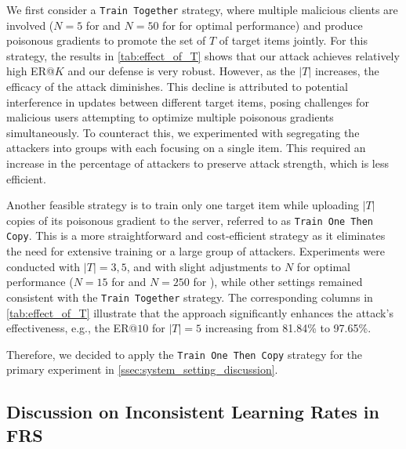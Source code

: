 We first consider a \texttt{Train Together} strategy, where multiple malicious clients are involved ($N=5$ for \modelI{} and $N=50$ for \modelII{} for optimal performance) and produce poisonous gradients to promote the set of $T$ of target items jointly.
For this strategy, the results in \cref{tab:effect_of_T} shows that our attack achieves relatively high ER@$K$ and our defense is very robust.
%
However, as the $|T|$ increases, the efficacy of the attack diminishes. This decline is attributed to potential interference in updates between different target items, posing challenges for malicious users attempting to optimize multiple poisonous gradients simultaneously.
To counteract this, we experimented with segregating the attackers into groups with each focusing on a single item. This required an increase in the percentage of attackers to preserve attack strength, which is less efficient.

Another feasible strategy is to train only one target item while uploading $|T|$ copies of its poisonous gradient to the server, referred to as \texttt{Train One Then Copy}. This is a more straightforward and cost-efficient strategy as it eliminates the need for extensive training or a large group of attackers.
Experiments were conducted with $|T|=3, 5$, and with slight adjustments to $N$ for optimal performance ($N=15$ for \modelI{} and $N=250$ for \modelII{}), while other settings remained consistent with the \texttt{Train Together} strategy. 
The corresponding columns in \cref{tab:effect_of_T} illustrate that the approach significantly enhances the attack's effectiveness, e.g., the ER@$10$ for $|T|=5$ increasing from 81.84\% to 97.65\%.

Therefore, we decided to apply the \texttt{Train One Then Copy} strategy for the primary experiment in \cref{ssec:system_setting_discussion}.

\subsection{Discussion on Inconsistent Learning Rates in FRS}

